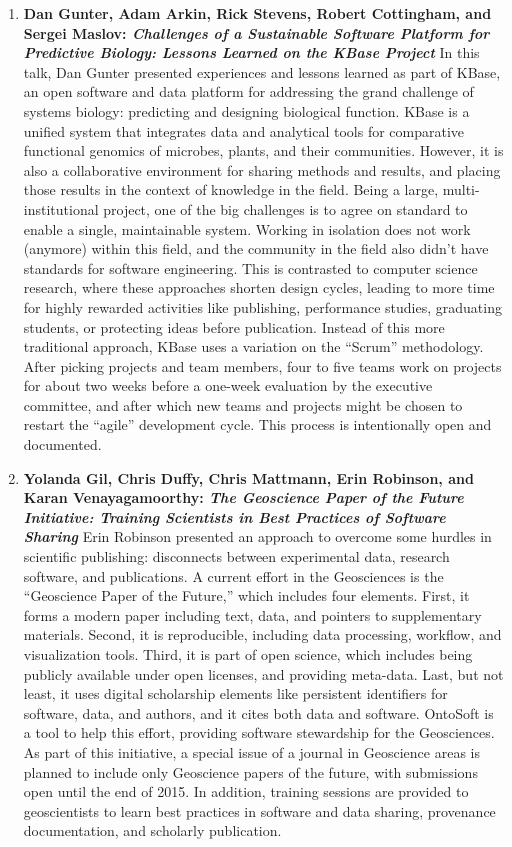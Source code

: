 \documentclass[11pt, oneside]{amsart}
\begin{document}
\begin{enumerate}
\item \textbf{Dan Gunter, Adam Arkin, Rick Stevens, Robert Cottingham, and
Sergei Maslov: \textit{Challenges of a Sustainable Software Platform for
Predictive Biology: Lessons Learned on the KBase Project}} In this talk, Dan
Gunter presented experiences and lessons learned as part of KBase, an open
software and data platform for addressing the grand challenge of systems
biology: predicting and designing biological function. KBase is a unified system
that integrates data and analytical tools for comparative functional genomics of
microbes, plants, and their communities. However, it is also a collaborative
environment for sharing methods and results, and placing those results in the
context of knowledge in the field. Being a large, multi-institutional project,
one of the big challenges is to agree on standard to enable a single,
maintainable system. Working in isolation does not work (anymore) within this
field, and the community in the field also didn't have standards for software
engineering. This is contrasted to computer science research, where these
approaches shorten design cycles, leading to more time for highly rewarded
activities like publishing, performance studies, graduating students, or
protecting ideas before publication. Instead of this more
traditional approach, KBase uses a variation on the ``Scrum'' methodology.
After picking projects and team members, four to five teams work on projects for about two
weeks before a one-week evaluation by the executive committee, and after which new
teams and projects might be chosen to restart the ``agile'' development cycle.
This process is intentionally open and documented.

\item \textbf{Yolanda Gil, Chris Duffy, Chris Mattmann, Erin Robinson, and Karan
Venayagamoorthy: \textit{The Geoscience Paper of the Future Initiative: Training
Scientists in Best Practices of Software Sharing}} Erin Robinson presented an
approach to overcome some hurdles in scientific publishing: disconnects between
experimental data, research software, and publications. A current effort in the
Geosciences is the ``Geoscience Paper of the Future,'' which includes four
elements. First, it forms a modern paper including text, data, and pointers to
supplementary materials. Second, it is reproducible, including data processing,
workflow, and visualization tools. Third, it is part of open science, which
includes being publicly available under open licenses, and providing meta-data.
Last, but not least, it uses digital scholarship elements like persistent
identifiers for software, data, and authors, and it cites both data and
software. OntoSoft is a tool to help this effort, providing software stewardship
for the Geosciences. As part of this initiative, a special issue of a journal in
Geoscience areas is planned to include only Geoscience papers of the future,
with submissions open until the end of 2015. In addition, training sessions are
provided to geoscientists to learn best practices in software and data sharing,
provenance documentation, and scholarly publication.


\end{enumerate}
\end{document}
